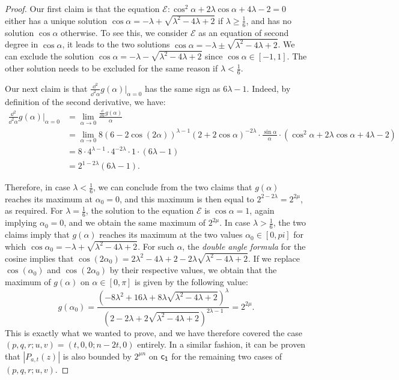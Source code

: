 \documentclass[11pt]{llncs}
\begin{document}
\begin{proof}
    Our first claim is that the equation $\mathcal E:\cos^2\alpha+2\lambda\cos\alpha+4\lambda-2=0$ either has a unique solution $\cos\alpha=-\lambda+\sqrt{\lambda^2-4\lambda+2}$ if $\lambda\geq\frac 16$, and has no solution $\cos\alpha$ otherwise. To see this, we consider $\mathcal E$ as an equation of second degree in $\cos\alpha$, it leads to the two solutions $\cos\alpha=-\lambda\pm\sqrt{\lambda^2-4\lambda+2}$. We can exclude the solution $\cos\alpha=-\lambda-\sqrt{\lambda^2-4\lambda+2}$ since $\cos\alpha\in[-1,1]$. The other solution needs to be excluded for the same reason if $\lambda<\frac 16$.

    Our next claim is that $\frac{\dd^2}{\dd^2\alpha}g(\alpha)\vert_{\alpha=0}$ has the same sign as $6\lambda -1$. Indeed, by definition of the second derivative, we have:
    \begin{align*}
        \frac{\dd^2}{\dd^2\alpha}g(\alpha)\vert_{\alpha=0}
        &=\lim_{\alpha\to 0}\frac{\frac{\dd}{\dd\alpha}g(\alpha)}{\alpha}\\
        &=\lim_{\alpha\to 0}8(6-2\cos(2\alpha))^{\lambda-1}(2+2\cos\alpha)^{-2\lambda}\cdot\frac{\sin\alpha}{\alpha}\cdot\left(\cos^2\alpha+2\lambda\cos\alpha+4\lambda-2\right)\\
        &=8\cdot4^{\lambda-1}\cdot 4^{-2\lambda}\cdot 1\cdot(6\lambda -1)\\
        &=2^{1-2\lambda}(6\lambda -1).
    \end{align*}

    Therefore, in case $\lambda<\frac 16$, we can conclude from the two claims that $g(\alpha)$ reaches its maximum at $\alpha_0=0$, and this maximum is then equal to $2^{2-2\lambda}=2^{2\mu}$, as required. For $\lambda=\frac 16$, the solution to the equation $\mathcal E$ is $\cos\alpha=1$, again implying $\alpha_0=0$, and we obtain the same maximum of $2^{2\mu}$. In case $\lambda>\frac 16$, the two claims imply that $g(\alpha)$ reaches its maximum at the two values $\alpha_0\in[0,pi]$ for which $\cos\alpha_0=-\lambda+\sqrt{\lambda^2-4\lambda+2}$. For such $\alpha$, the \textit{double angle formula} for the cosine implies that $\cos(2\alpha_0)=2\lambda^2-4\lambda+2-2\lambda\sqrt{\lambda^2-4\lambda+2}$. If we replace $\cos(\alpha_0)$ and $\cos(2\alpha_0)$ by their respective values, we obtain that the maximum of $g(\alpha)$ on $\alpha\in[0,\pi]$ is given by the following value:
    \[
        g(\alpha_0)=\frac{\left(-8\lambda^2+16\lambda+8\lambda\sqrt{\lambda^2-4\lambda+2}\right)^{\lambda}}{\left(2-2\lambda+2\sqrt{\lambda^2-4\lambda+2}\right)^{2\lambda-1}}=2^{2\mu}.
    \]
    This is exactly what we wanted to prove, and we have therefore covered the case $(p,q,r;u,v)=(t,0,0;n-2t,0)$ entirely. In a similar fashion, it can be proven that $|P_{a,t}(z)|$ is also bounded by $2^{\mu n}$ on $\mathsf{c_1}$  for the remaining two cases of $(p,q,r;u,v)$.
\end{proof}
\end{document}
